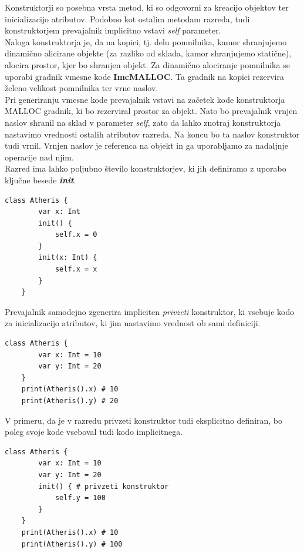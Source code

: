 \documentclass[a4paper, 12p]{book}
\begin{document}
Konstruktorji so posebna vrsta metod, ki so odgovorni za kreacijo objektov ter inicializacijo atributov. Podobno kot ostalim metodam razreda, tudi konstruktorjem prevajalnik implicitno vstavi \textit{self} parameter. \\
\indent Naloga konstruktorja je, da na kopici, tj. delu pomnilnika, kamor shranjujemo dinamično alicirane objekte (za razliko od sklada, kamor shranjujemo statične), alocira prostor, kjer bo shranjen objekt. Za dinamično alociranje pomnilnika se uporabi gradnik vmesne kode \textbf{ImcMALLOC}. Ta gradnik na kopici rezervira želeno velikost pomnilnika ter vrne naslov. \\
\indent Pri generiranju vmesne kode prevajalnik vstavi na začetek kode konstruktorja MALLOC gradnik, ki bo rezerviral prostor za objekt. Nato bo prevajalnik vrnjen naslov shranil na sklad v parameter \textit{self}, zato da lahko znotraj konstruktorja nastavimo vrednosti ostalih atributov razreda. Na koncu bo ta naslov konstruktor tudi vrnil. Vrnjen naslov je referenca na objekt in ga uporabljamo za nadaljnje operacije nad njim. \\
\indent Razred ima lahko poljubno število konstruktorjev, ki jih definiramo z uporabo ključne besede \textit{\textbf{init}}. 

\begin{lstlisting}[caption={Konsturktorji.}, captionpos=b]
	class Atheris {
	    var x: Int
	    init() {
	        self.x = 0
	    }
	    init(x: Int) {
	        self.x = x
	    }
	}
\end{lstlisting}

\indent Prevajalnik samodejno zgenerira impliciten \textit{privzeti} konstruktor, ki vsebuje kodo za inicializacijo atributov, ki jim nastavimo vrednost ob sami definiciji. 

\begin{lstlisting}[caption={Implicitni privzeti konstruktor.}, captionpos=b]
	class Atheris {
	    var x: Int = 10
	    var y: Int = 20
	}
	print(Atheris().x) # 10
	print(Atheris().y) # 20
\end{lstlisting}

V primeru, da je v razredu privzeti konstruktor tudi eksplicitno definiran, bo poleg svoje kode vseboval tudi kodo implicitnega.

\begin{lstlisting}[caption={Eksplicitni privzeti konstruktor.}, captionpos=b]
	class Atheris {
	    var x: Int = 10
	    var y: Int = 20
	    init() { # privzeti konstruktor
	        self.y = 100
	    }
	}
	print(Atheris().x) # 10
	print(Atheris().y) # 100
\end{lstlisting}
\end{document}
